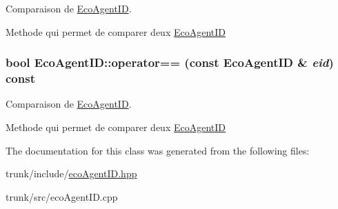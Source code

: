 Comparaison de \hyperlink{classEcoAgentID}{EcoAgentID}. 

Methode qui permet de comparer deux \hyperlink{classEcoAgentID}{EcoAgentID} \hypertarget{classEcoAgentID_a6c183361e0ccdab9da2c6666d77c111}{
\subsubsection[{operator==}]{\setlength{\rightskip}{0pt plus 5cm}bool EcoAgentID::operator== (const {\bf EcoAgentID} \& {\em eid}) const}}
\label{classEcoAgentID_a6c183361e0ccdab9da2c6666d77c111}


Comparaison de \hyperlink{classEcoAgentID}{EcoAgentID}. 

Methode qui permet de comparer deux \hyperlink{classEcoAgentID}{EcoAgentID} 

The documentation for this class was generated from the following files:\begin{CompactItemize}
\item 
trunk/include/\hyperlink{ecoAgentID_8hpp}{ecoAgentID.hpp}\item 
trunk/src/ecoAgentID.cpp\end{CompactItemize}
